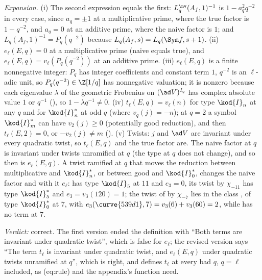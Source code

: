 \begin{sloppypar}
\emph{Expansion.} (i) The second expression equals the first: $L^{\nv}_q(A_f,1)^{-1}$ is $1-a_q^2q^{-2}$ in every case, since $a_q=\pm1$ at a multiplicative prime, where
the true factor is $1-q^{-2}$, and $a_q=0$ at an additive prime, where the naive factor is $1$; and $L_q(A_f,1)^{-1}=P_q(q^{-2})$ because $L_q(A_f,s)=L_q(\Sym f,s+1)$.
(ii) $e_\ell(E,q)=0$ at a multiplicative prime (naive equals true), and $e_\ell(E,q)=v_\ell(P_q(q^{-2}))$ at an additive prime. (iii) $e_\ell(E,q)$ is a finite
nonnegative integer: $P_q$ has integer coefficients and constant term $1$, $q^{-2}$ is an $\ell$-adic unit, so $P_q(q^{-2})\in\Z[1/q]$ has nonnegative valuation; it is
nonzero because each eigenvalue $\lambda$ of the geometric Frobenius on $(\ad V)^{I_q}$ has complex absolute value $1$ or $q^{-1}$ (), so $1-\lambda q^{-1}\ne0$. (iv)
$t_\ell(E,q)=v_\ell(n)$ for type $\kod{I}_n$ at any $q$ and for $\kod{I}_n^*$ at odd $q$ (where $v_q(j)=-n$); at $q=2$ a symbol $\kod{I}_m^*$ can have $v_2(j)\ge0$ (potentially good
reduction), and then $t_\ell(E,2)=0$, or $-v_2(j)\ne m$ (). (v) Twists: $j$ and $\ad V$ are invariant under every quadratic twist, so $t_\ell(E,q)$
and the true factor are. The naive factor at $q$ is invariant under twists unramified at $q$ (the type at $q$ does not change), and so then is $e_\ell(E,q)$. A twist
ramified at $q$ that moves the reduction between multiplicative and $\kod{I}_n^*$, or between good and $\kod{I}_0^*$, changes the naive factor and with it $e_\ell$:
 has type $\kod{I}_5$ at $11$ and $e_3=0$, its twist  by $\chi_{-11}$ has type $\kod{I}_5^*$ and $e_3=v_3(120)=1$; the twist  of  by
$\chi_{-7}$ lies in the class , of type $\kod{I}_0^*$ at $7$, with $e_3(\curve{539d1},7)=v_3(6)+v_3(60)=2$, while  has no term at $7$.

\emph{Verdict:} correct. The first version ended the definition with ``Both terms are invariant under quadratic twist'', which is false for $e_\ell$; the revised
version says ``The term $t_\ell$ is invariant under quadratic twist, and $e_\ell(E,q)$ under quadratic twists unramified at $q$'', which is right, and defines
$t_\ell$ at every bad $q$, $q=\ell$ included, as (eq:rule) and the appendix's function need.


\end{sloppypar}
